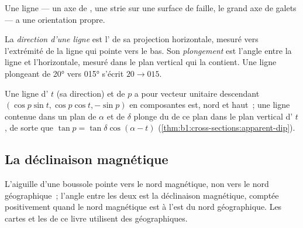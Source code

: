 Une ligne --- un axe de , une strie sur une surface de faille, le grand axe de
galets --- a une orientation propre.

\begin{definition}\label{def:b1:field-lab-methods-1:trend-plunge}
La \emph{direction d'une ligne} est l' de sa
projection horizontale, mesuré vers l'extrémité de la ligne qui pointe vers le
bas. Son \emph{plongement} est l'angle entre la ligne et
l'horizontale, mesuré dans le plan vertical qui la contient. Une ligne plongeant
de \ang{20} vers \ang{015} s'écrit $20\to015$.
\end{definition}

Une ligne d' $t$ (sa direction) et de  $p$ a pour vecteur
unitaire descendant
$(\cos p\sin t, \cos p\cos t, -\sin p)$ en composantes est, nord et haut~;
une ligne contenue dans un plan de  $\alpha$ et de 
$\delta$ plonge du  de ce plan dans le plan vertical d'
$t$, de sorte que
$\tan p = \tan\delta\cos(\alpha - t)$ (\cref{thm:b1:cross-sections:apparent-dip}).

\subsection{La déclinaison magnétique}

L'aiguille d'une boussole pointe vers le nord magnétique, non vers le nord
géographique~; l'angle entre les deux est la déclinaison magnétique, comptée
positivement quand le nord magnétique est à l'est du nord géographique. Les
cartes et les  de ce livre utilisent des  géographiques.

